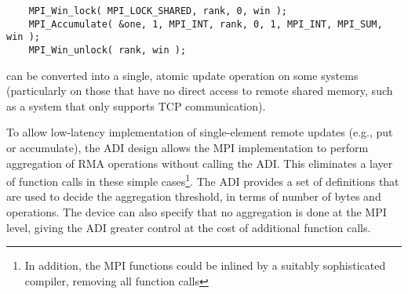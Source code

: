 \begin{small}
\begin{verbatim}
    MPI_Win_lock( MPI_LOCK_SHARED, rank, 0, win );
    MPI_Accumulate( &one, 1, MPI_INT, rank, 0, 1, MPI_INT, MPI_SUM, win );
    MPI_Win_unlock( rank, win );
\end{verbatim}
\end{small}

\noindent
can be converted into a single, atomic update operation on some
systems (particularly on those that have no direct access to remote
shared memory, such as a system that only supports TCP communication).

To allow low-latency implementation of single-element remote updates
(e.g., put or accumulate), the ADI design allows the MPI
implementation to perform aggregation of RMA operations without
calling the ADI.  This eliminates a layer of function calls in these
simple cases\footnote{In addition, the MPI functions could be inlined by a
  suitably sophisticated compiler,
removing all function calls}.  
The ADI provides a set of definitions
that are used to decide the aggregation threshold, in terms of number
of bytes and operations.  The device can also specify that no
aggregation is done at the MPI level, giving the ADI greater control
at the cost of additional function calls.
%
%

